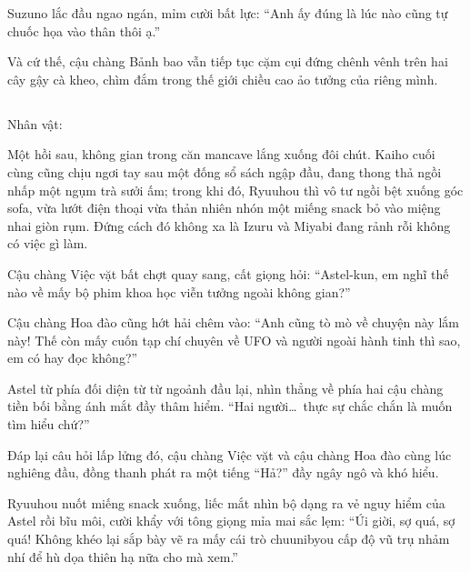 \documentclass[../main.tex]{subfiles}
\begin{document}
Suzuno lắc đầu ngao ngán, mỉm cười bất lực: ``Anh ấy đúng là lúc nào cũng tự chuốc họa vào thân thôi ạ.''

Và cứ thế, cậu chàng Bảnh bao vẫn tiếp tục cặm cụi đứng chênh vênh trên hai cây gậy cà kheo, chìm đắm trong thế giới chiều cao ảo tưởng của riêng mình.

\newpage

\subsection*{\label{ep-M34.III}}
\vspace{-4pt}
\begin{center}
    {\caviar\fontsize{12pt}{12pt}\selectfont Nhân vật:     }
\end{center}

Một hồi sau, không gian trong căn mancave lắng xuống đôi chút. Kaiho cuối cùng cũng chịu ngơi tay sau một đống sổ sách ngập đầu, đang thong thả ngồi nhấp một ngụm trà sưởi ấm; trong khi đó, Ryuuhou thì vô tư ngồi bệt xuống góc sofa, vừa lướt điện thoại vừa thản nhiên nhón một miếng snack bỏ vào miệng nhai giòn rụm. Đứng cách đó không xa là  Izuru và Miyabi đang rảnh rỗi không có việc gì làm.

Cậu chàng Việc vặt bất chợt quay sang, cất giọng hỏi: ``Astel-kun, em nghĩ thế nào về mấy bộ phim khoa học viễn tưởng ngoài không gian?''

Cậu chàng Hoa đào cũng hớt hải chêm vào: ``Anh cũng tò mò về chuyện này lắm này! Thế còn mấy cuốn tạp chí chuyên về UFO và người ngoài hành tinh thì sao, em có hay đọc không?''

Astel từ phía đối diện từ từ ngoảnh đầu lại, nhìn thẳng về phía hai cậu chàng tiền bối bằng ánh mắt đầy thâm hiểm. ``Hai người\dots\ thực sự chắc chắn là muốn tìm hiểu chứ?''

Đáp lại câu hỏi lấp lửng đó, cậu chàng Việc vặt và cậu chàng Hoa đào cùng lúc nghiêng đầu, đồng thanh phát ra một tiếng ``Hả?'' đầy ngây ngô và khó hiểu.


Ryuuhou nuốt miếng snack xuống, liếc mắt nhìn bộ dạng ra vẻ nguy hiểm của Astel rồi bĩu môi, cười khẩy với tông giọng mỉa mai sắc lẹm: ``Úi giời, sợ quá, sợ quá! Không khéo lại sắp bày vẽ ra mấy cái trò chuunibyou cấp độ vũ trụ nhảm nhí để hù dọa thiên hạ nữa cho mà xem.''
\end{document}
